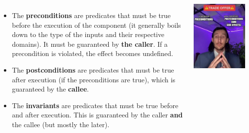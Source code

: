 \documentclass[10pt,
aspectratio=169
]{beamer}
\begin{document}
\begin{frame}
	\vspace*{1em}
	\begin{columns}
		\begin{itemize}
			\item The \textbf{preconditions} are predicates that must be true before the execution of the component (it generally boils down to the type of the inputs and their respective domains). It must be guaranteed by \textbf{the caller}. If a precondition is violated, the effect becomes undefined.
			\item The \textbf{postconditions} are predicates that must be true after execution (if the preconditions are true), which is guaranteed by the \textbf{callee}.
			\item The \textbf{invariants} are predicates that must be true before and after execution. This is guaranteed by the caller \textbf{and} the callee (but mostly the later).
		\end{itemize}
		
		\begin{center}
			\includegraphics[width=\linewidth]{im/meme-prepost}
		\end{center}
	\end{columns}
\end{frame}
\end{document}

